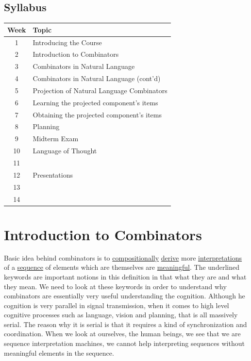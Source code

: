 \documentclass[12pt,a4paper]{article}
\begin{document}
\subsection{Syllabus}
\begin{table}[H]
\renewcommand{\arraystretch}{1.5}
\begin{tabular}{|c l|}
\hline
Week & Topic                                   \\ \hline
1    & Introducing the Course                  \\ \hline
2    & Introduction to Combinators 			   \\ \hline
3    & Combinators in Natural Language              \\ \hline
4    & Combinators in Natural Language (cont'd)      \\ \hline
5    & Projection of Natural Language Combinators       \\ \hline
6    & Learning the projected component's items\\ \hline
7    & Obtaining the projected component's items\\ \hline
8    & Planning                          		\\ \hline
9    & Midterm Exam                     		 \\ \hline
10   & Language of Thought             			\\ \hline
11   &        									 \\ \hline
12   & Presentations               				\\ \hline
13   &                							\\ \hline
14   &                							\\ \hline
\end{tabular}
\end{table}

\section{Introduction to Combinators}
Basic idea behind combinators is to \underline{compositionally} \underline{derive} more \underline{interpretations} of a \underline{sequence} of elements which are themselves are \underline{meaningful}. The underlined keywords are important notions in this definition in that what they are and what they mean. We need to look at these keywords in order to understand why combinators are essentially very useful understanding the cognition.  Although he cognition is very parallel in signal transmission, when it comes to high level cognitive processes such as language, vision and planning, that is all massively serial. The reason why it is serial is that it requires a kind of synchronization and coordination. When we look at ourselves, the human beings, we see that we are sequence interpretation machines, we cannot help interpreting sequences without meaningful elements in the sequence.
\end{document}
